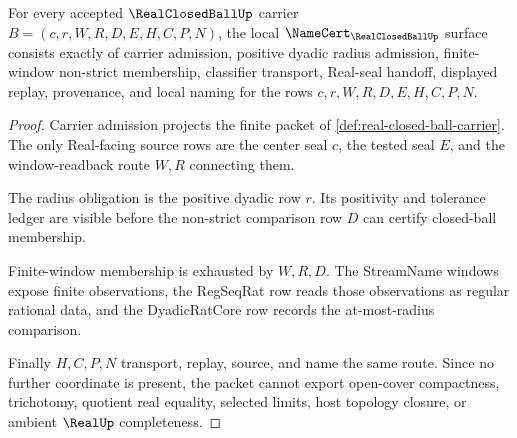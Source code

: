 \begin{theorem}
\label{thm:real-closed-ball-namecert-obligations}
For every accepted $\RealClosedBallUp$ carrier $B=(c,r,W,R,D,E,H,C,P,N)$, the local $\NameCert_{\RealClosedBallUp}$ surface consists exactly of carrier admission, positive dyadic radius admission, finite-window non-strict membership, classifier transport, Real-seal handoff, displayed replay, provenance, and local naming for the rows $c,r,W,R,D,E,H,C,P,N$.
\end{theorem}
\begin{proof}
Carrier admission projects the finite packet of \autoref{def:real-closed-ball-carrier}. The only Real-facing source rows are the center seal $c$, the tested seal $E$, and the window-readback route $W,R$ connecting them.

The radius obligation is the positive dyadic row $r$. Its positivity and tolerance ledger are visible before the non-strict comparison row $D$ can certify closed-ball membership.

Finite-window membership is exhausted by $W,R,D$. The StreamName windows expose finite observations, the RegSeqRat row reads those observations as regular rational data, and the DyadicRatCore row records the at-most-radius comparison.

Finally $H,C,P,N$ transport, replay, source, and name the same route. Since no further coordinate is present, the packet cannot export open-cover compactness, trichotomy, quotient real equality, selected limits, host topology closure, or ambient $\RealUp$ completeness.
\end{proof}

